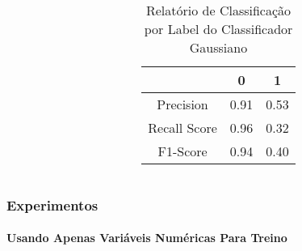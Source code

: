 \documentclass{beamer}
\begin{document}
\begin{frame}
\begin{columns}
\begin{column}{0.5\textwidth}
\begin{table}[H]
\begin{small}
\begin{tabular}{ccc}
                            \hline
                        \end{tabular}
                    \end{small}
                \end{table}
            \end{column}
            \begin{column}{0.5\textwidth}
                \begin{table}[H]

                    \centering
                    \caption{\label{tab:cr3-gnb} Relatório de Classificação por Label do Classificador Gaussiano}
                    \begin{small}
                        \begin{tabular}{ccc}
                        
                            \hline
                                                    & 0                & 1\\
                            \hline
                            Precision               & 0.91             & 0.53\\
                            Recall Score            & 0.96             & 0.32\\
                            F1-Score                & 0.94             & 0.40\\
                            
                            \hline
                        \end{tabular}
                    \end{small}
                
                \end{table}
            \end{column}
            \end{columns}    
    \end{frame}
    
\begin{frame}
    \frametitle{Experimentos}
    \framesubtitle{Usando Apenas Variáveis Numéricas Para Treino}
    
\end{frame}
\end{document}
